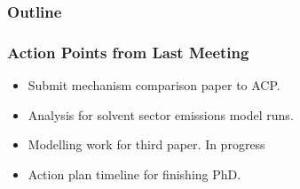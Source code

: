 \begin{frame}
    \frametitle{Outline} 
    \tableofcontents[currentsection]
\end{frame} 

\begin{frame}
    \frametitle{Action Points from Last Meeting}

    \vspace{-5mm}
    \begin{itemize}
        \item Submit mechanism comparison paper to ACP. \Checkmark \vspace{5mm}
        \item Analysis for solvent sector emissions model runs. \Checkmark \vspace{5mm}
        \item Modelling work for third paper. \alert{In progress} \vspace{5mm}
        \item Action plan timeline for finishing PhD. \Checkmark
    \end{itemize} 
\end{frame} 
